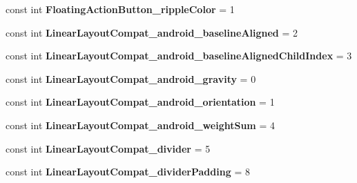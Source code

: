 \begin{DoxyCompactItemize}
\item 
\hypertarget{classClient_1_1Droid_1_1Resource_1_1Styleable_a8c61b179e89a96ca609d9d99f04e157f}{}const int {\bfseries Floating\+Action\+Button\+\_\+ripple\+Color} = 1\label{classClient_1_1Droid_1_1Resource_1_1Styleable_a8c61b179e89a96ca609d9d99f04e157f}

\item 
\hypertarget{classClient_1_1Droid_1_1Resource_1_1Styleable_a751747ebc52a02eb39f9061ef81658a8}{}const int {\bfseries Linear\+Layout\+Compat\+\_\+android\+\_\+baseline\+Aligned} = 2\label{classClient_1_1Droid_1_1Resource_1_1Styleable_a751747ebc52a02eb39f9061ef81658a8}

\item 
\hypertarget{classClient_1_1Droid_1_1Resource_1_1Styleable_ac3de6d687936d11bce279d0edc963a0b}{}const int {\bfseries Linear\+Layout\+Compat\+\_\+android\+\_\+baseline\+Aligned\+Child\+Index} = 3\label{classClient_1_1Droid_1_1Resource_1_1Styleable_ac3de6d687936d11bce279d0edc963a0b}

\item 
\hypertarget{classClient_1_1Droid_1_1Resource_1_1Styleable_a853a1c6b3c4fd242a033fb8c424b9de3}{}const int {\bfseries Linear\+Layout\+Compat\+\_\+android\+\_\+gravity} = 0\label{classClient_1_1Droid_1_1Resource_1_1Styleable_a853a1c6b3c4fd242a033fb8c424b9de3}

\item 
\hypertarget{classClient_1_1Droid_1_1Resource_1_1Styleable_a7509d72dde6691ee7c15db56a6d966a5}{}const int {\bfseries Linear\+Layout\+Compat\+\_\+android\+\_\+orientation} = 1\label{classClient_1_1Droid_1_1Resource_1_1Styleable_a7509d72dde6691ee7c15db56a6d966a5}

\item 
\hypertarget{classClient_1_1Droid_1_1Resource_1_1Styleable_abd2f8cc6351009d562ce273d914f244c}{}const int {\bfseries Linear\+Layout\+Compat\+\_\+android\+\_\+weight\+Sum} = 4\label{classClient_1_1Droid_1_1Resource_1_1Styleable_abd2f8cc6351009d562ce273d914f244c}

\item 
\hypertarget{classClient_1_1Droid_1_1Resource_1_1Styleable_adc18c40f4971fc937b5e54109c3eadf8}{}const int {\bfseries Linear\+Layout\+Compat\+\_\+divider} = 5\label{classClient_1_1Droid_1_1Resource_1_1Styleable_adc18c40f4971fc937b5e54109c3eadf8}

\item 
\hypertarget{classClient_1_1Droid_1_1Resource_1_1Styleable_a65db6243be0282323c0a12e0b7655ce1}{}const int {\bfseries Linear\+Layout\+Compat\+\_\+divider\+Padding} = 8\label{classClient_1_1Droid_1_1Resource_1_1Styleable_a65db6243be0282323c0a12e0b7655ce1}


\end{DoxyCompactItemize}
